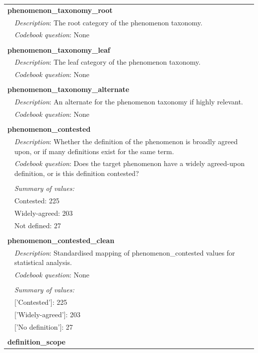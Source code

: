 {\begin{longtable}{p{}p{}}
\\
\multicolumn{2}{l}{\textbf{phenomenon\_taxonomy\_root}} \\
& \textit{Description}: The root category of the phenomenon taxonomy. \\
& \textit{Codebook question}: None \\
\\
\multicolumn{2}{l}{\textbf{phenomenon\_taxonomy\_leaf}} \\
& \textit{Description}: The leaf category of the phenomenon taxonomy. \\
& \textit{Codebook question}: None \\
\\
\multicolumn{2}{l}{\textbf{phenomenon\_taxonomy\_alternate}} \\
& \textit{Description}: An alternate for the phenomenon taxonomy if highly relevant. \\
& \textit{Codebook question}: None \\
\\
\multicolumn{2}{l}{\textbf{phenomenon\_contested}} \\
& \textit{Description}: Whether the definition of the phenomenon is broadly agreed upon, or if many definitions exist for the same term. \\
& \textit{Codebook question}: Does the target phenomenon have a widely agreed-upon definition, or is this definition contested? \\
\\
& \textit{Summary of values:} \\
& Contested: 225 \\
& Widely-agreed: 203 \\
& Not defined: 27 \\
\\
\multicolumn{2}{l}{\textbf{phenomenon\_contested\_clean}} \\
& \textit{Description}: Standardised mapping of phenomenon\_contested values for statistical analysis. \\
& \textit{Codebook question}: None \\
\\
& \textit{Summary of values:} \\
& ['Contested']: 225 \\
& ['Widely-agreed']: 203 \\
& ['No definition']: 27 \\
\\
\multicolumn{2}{l}{\textbf{definition\_scope}} \\

\end{longtable}}
